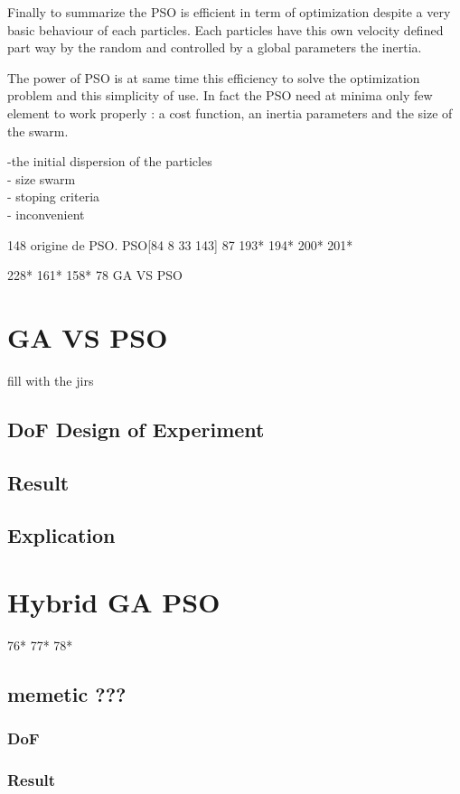 Finally to summarize the PSO is efficient in term of optimization despite a very basic behaviour of each particles. Each particles have this own velocity defined part way by the random and controlled by a global parameters the inertia.

 The power of PSO is at same time this efficiency to solve the optimization problem and this simplicity of use. In fact the PSO need at minima only few element to work properly : a cost function, an inertia parameters and the size of the swarm.





-the initial dispersion of the particles \\
- size swarm \\
- stoping criteria \\
- inconvenient 


148 origine de PSO. 
PSO[84 8 33 143] 87 193* 194* 200* 201* 

228* 161* 158* 78 GA VS PSO

\section{GA VS PSO }\label{sec:GAvsPSO} 
fill with the jirs 
	\subsection{DoF Design of Experiment}
	\subsection{Result}
	\subsection{Explication}

\section{Hybrid GA PSO}
 76* 77* 78*
	\subsection{memetic ???}
		\subsubsection{DoF}
		\subsubsection{Result}
